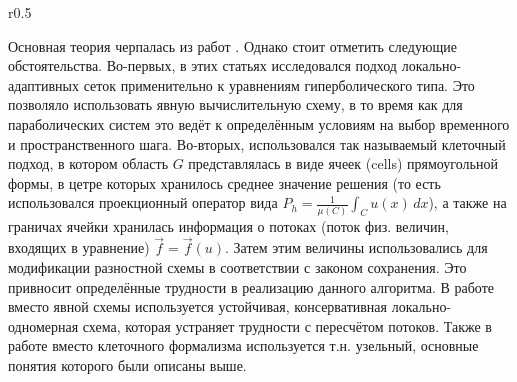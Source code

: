 \begin{wrapfigure}{r}{0.5\textwidth}
    \begin{center}
    \end{center}
\end{wrapfigure}
Основная теория черпалась из работ \cite{berger1982adaptive, berger1989local, deiterding2011block}.
Однако стоит отметить следующие обстоятельства.
Во-первых, в этих статьях исследовался подход локально-адаптивных сеток применительно к уравнениям гиперболического типа.
Это позволяло использовать явную вычислительную схему, в то время как для параболических систем это ведёт к определённым условиям на выбор временного и пространственного шага.
Во-вторых, использовался так называемый клеточный подход, в котором область $G$ представлялась в виде ячеек (cells) прямоугольной формы, в цетре которых хранилось среднее значение решения (то есть использовался проекционный оператор вида $P_h = \frac{1}{\mu(C)} \int_{C} u(x)\, dx$), а также на граничах ячейки хранилась информация о потоках (поток физ. величин, входящих в уравнение) $\vec f = \vec f(u)$.
Затем этим величины использовались для модификации разностной схемы в соответствии с законом сохранения.
Это привносит определённые трудности в реализацию данного алгоритма.
В работе вместо явной схемы используется устойчивая, консервативная локально-одномерная схема, которая устраняет трудности с пересчётом потоков.
Также в работе вместо клеточного формализма используется т.н. узельный, основные понятия которого были описаны выше.
